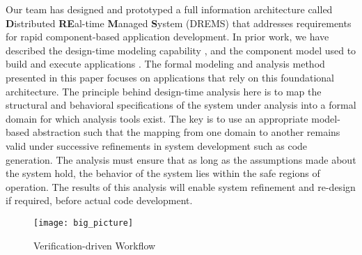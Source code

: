 Our team has designed and prototyped a full information architecture called \textbf{D}istributed \textbf{RE}al-time \textbf{M}anaged \textbf{S}ystem (DREMS) \cite{ISIS_F6_Aerospace:12,DREMS13Software} that addresses requirements for rapid component-based application development. In prior work, we have described the design-time modeling capability \cite{ISIS_F6_SFFMT:13}, and the component model used to build and execute applications \cite{ISIS_F6_ISORC:13}.
The formal modeling and analysis method presented in this paper focuses on applications that rely on this foundational architecture. The principle behind design-time analysis here is to map the structural and behavioral specifications of the system under analysis into a formal domain for which analysis tools exist. The key is to use an appropriate model-based abstraction such that the mapping from one domain to another remains valid under successive refinements in system development such as code generation. 
The analysis must ensure that as long as the assumptions made about the system hold, the behavior of the system lies within the safe regions of operation.  The results of this analysis will enable system refinement and re-design if required, before actual code development. 



\vspace{-0.12in}
\begin{figure}[ht]
\centering
\texttt{[image: big\_picture]}
\caption{Verification-driven Workflow}
\label{fig:big_picture}
\vspace{-0.16in}
\end{figure}

